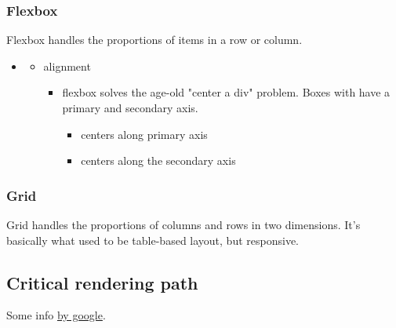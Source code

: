 \subsubsection{Flexbox}\label{flexbox}
Flexbox handles the proportions of items in a row or column.
\begin{itemize}
    \item {} \begin{itemize}
        \item alignment \begin{itemize}
            \item flexbox solves the age-old "center a div" problem. Boxes with  have a primary and secondary axis. \begin{itemize}
                \item {} centers along primary axis
                \item {} centers along the secondary axis
            \end{itemize}
        \end{itemize}
    \end{itemize}
\end{itemize}

\subsubsection{Grid}
Grid handles the proportions of columns and rows in two dimensions. It's basically what used to be table-based layout, but responsive.

\subsection{Critical rendering path} 
Some info \href{https://developers.google.com/web/fundamentals/performance/critical-rendering-path/optimizing-critical-rendering-path}{by google}.